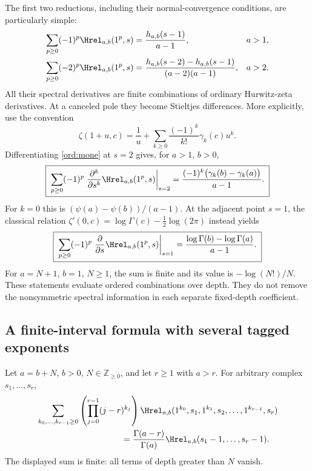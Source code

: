 The first two reductions, including their normal-convergence conditions,
are particularly simple:
\begin{align}
 \sum_{p\ge0}(-1)^p\Hrel_{a,b}(1^p,s)
    &=\frac{h_{a,b}(s-1)}{a-1}, && a>1, \label{ord:mone}\\
 \sum_{p\ge0}(-2)^p\Hrel_{a,b}(1^p,s)
    &=\frac{h_{a,b}(s-2)-h_{a,b}(s-1)}
            {(a-2)(a-1)}, && a>2. \label{ord:mtwo}
\end{align}
All their spectral derivatives are finite combinations of ordinary
Hurwitz-zeta derivatives.  At a canceled pole they become Stieltjes
differences.  More explicitly, use the convention
\[
 \zeta(1+u,c)=\frac1u+
       \sum_{k\ge0}\frac{(-1)^k}{k!}\gamma_k(c)u^k.
\]
Differentiating \eqref{ord:mone} at $s=2$ gives, for $a>1$, $b>0$,
\begin{equation}\label{ord:stieltjes}
 \boxed{\;
 \sum_{p\ge0}(-1)^p
    \left.\frac{\partial^k}{\partial s^k}
          \Hrel_{a,b}(1^p,s)\right|_{s=2}
  =\frac{(-1)^k\bigl(\gamma_k(b)-\gamma_k(a)\bigr)}{a-1}.
 \;}
\end{equation}
For $k=0$ this is $(\psi(a)-\psi(b))/(a-1)$.
At the adjacent point $s=1$, the classical relation
$\zeta'(0,c)=\log\Gamma(c)-\tfrac12\log(2\pi)$
\cite[\S25.11]{DLMF} instead yields
\begin{equation}\label{ord:gamma}
 \boxed{\;
 \sum_{p\ge0}(-1)^p
    \left.\frac{\partial}{\partial s}
          \Hrel_{a,b}(1^p,s)\right|_{s=1}
       =\frac{\log\Gamma(b)-\log\Gamma(a)}{a-1}.
 \;}
\end{equation}
For $a=N+1$, $b=1$, $N\ge1$, the sum is finite and its value is
$-\log(N!)/N$.  These statements evaluate ordered combinations over
depth.  They do not remove the nonsymmetric spectral information in
each separate fixed-depth coefficient.

\subsection{A finite-interval formula with several tagged exponents}

\begin{corollary}\label{ord:staircase}
Let $a=b+N$, $b>0$, $N\in\mathbb Z_{\ge0}$, and let $r\ge1$ with
$a>r$.  For arbitrary complex $s_1,\ldots,s_r$,
\begin{equation}\label{ord:stairformula}
 \begin{split}
 &\sum_{k_0,\ldots,k_{r-1}\ge0}
       \left(\prod_{j=0}^{r-1}(j-r)^{k_j}\right)
       \Hrel_{a,b}(1^{k_0},s_1,1^{k_1},s_2,\ldots,
                                  1^{k_{r-1}},s_r)\\
 &\hspace{35mm}
       =\frac{\Gamma(a-r)}{\Gamma(a)}
                    \Hrel_{a,b}(s_1-1,\ldots,s_r-1).
 \end{split}
\end{equation}
The displayed sum is finite: all terms of depth greater than $N$ vanish.
\end{corollary}

